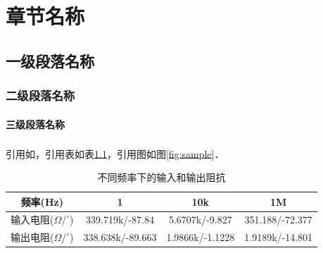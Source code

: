 \documentclass[utf8, a4paper, 10.5pt]{book}
\newcommand\clearemptydoublepage{\clearpage{\thispagestyle{empty}\cleardoublepage}}
\newcommand{\upcite}[1]{\textsuperscript{\cite{#1}}} %
\renewcommand\contentsname{全文目录}
\begin{document}
{
	\fancyhf{}
	\fancyfoot[CO,CE]{~\thepage~}
	\renewcommand{\headrulewidth}{0.7pt}
	\renewcommand{\footrulewidth}{0pt}
}
\fancyhf{}
\fancyfoot[CO,CE]{~\thepage~}
\renewcommand{\headrulewidth}{0.7pt}
\renewcommand{\footrulewidth}{0pt}
\renewcommand{\contentsname}{\centerline{全文目录}}
\renewcommand{\listfigurename}{\centerline{图目录}}
\renewcommand{\listtablename}{\centerline{表目录}}
\tableofcontents
{}
\clearemptydoublepage

\listoftables
\clearemptydoublepage

\listoffigures
\clearemptydoublepage






{
	\fancyhf{}
	\fancyhead[RO]{\leftmark}
	\fancyhead[LE]{\rightmark}
	\fancyfoot[RO,LE]{~\thepage~}
	\renewcommand{\headrulewidth}{0.7pt}
	\renewcommand{\footrulewidth}{0pt}
}
\fancyhf{}
\fancyhead[RO]{\leftmark}
\fancyhead[LE]{\rightmark}
\fancyfoot[RO,LE]{~\thepage~}
\renewcommand{\headrulewidth}{0.7pt}
\renewcommand{\footrulewidth}{0pt}




\setcounter{page}{1}
\fontsize{12pt}{18pt}\selectfont



\chapter{章节名称}
\section{一级段落名称}
\subsection{二级段落名称}
\subsubsection{三级段落名称}

引用如\upcite{PhysRev.47.777}，引用表如表\ref{tab:input_output_r}，引用图如图\ref{fig:sample}．

\begin{table}[h]
\normalsize
\centering
\caption{不同频率下的输入和输出阻抗}
\label{tab:input_output_r}
\begin{tabular}{cccc} %
\toprule %
频率(Hz) & 1 & 10k & 1M \\
\midrule
输入电阻($\Omega/^\circ$) & 339.719k/-87.84 & 5.6707k/-9.827 & 351.188/-72.377\\
输出电阻($\Omega/^\circ$) & 338.638k/-89.663 & 1.9866k/-1.1228 & 1.9189k/-14.801 \\
\bottomrule
\end{tabular}
\end{table}
\end{document}
